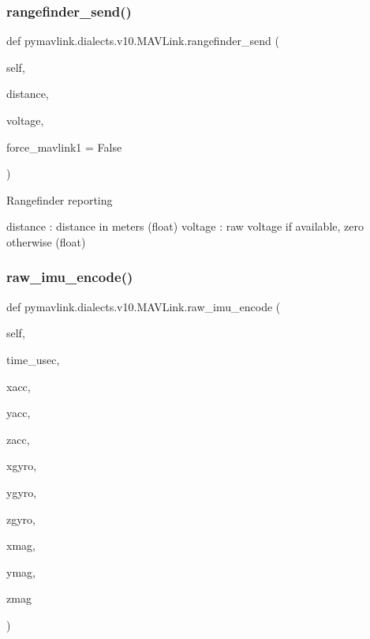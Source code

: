 \begin{DoxyVerb}
\begin{DoxyVerb}
\begin{DoxyVerb}
\begin{DoxyVerb}
\subsubsection{\texorpdfstring{rangefinder\+\_\+send()}{rangefinder\_send()}}
{\footnotesize\ttfamily def pymavlink.\+dialects.\+v10.\+M\+A\+V\+Link.\+rangefinder\+\_\+send (\begin{DoxyParamCaption}\item[{}]{self,  }\item[{}]{distance,  }\item[{}]{voltage,  }\item[{}]{force\+\_\+mavlink1 = {\ttfamily False} }\end{DoxyParamCaption})}

\begin{DoxyVerb}Rangefinder reporting

distance                  : distance in meters (float)
voltage                   : raw voltage if available, zero otherwise (float)\end{DoxyVerb}
 \mbox{\label{classpymavlink_1_1dialects_1_1v10_1_1MAVLink_a106a3af40129278c05f6205932a32ddc}} 
\subsubsection{\texorpdfstring{raw\+\_\+imu\+\_\+encode()}{raw\_imu\_encode()}}
{\footnotesize\ttfamily def pymavlink.\+dialects.\+v10.\+M\+A\+V\+Link.\+raw\+\_\+imu\+\_\+encode (\begin{DoxyParamCaption}\item[{}]{self,  }\item[{}]{time\+\_\+usec,  }\item[{}]{xacc,  }\item[{}]{yacc,  }\item[{}]{zacc,  }\item[{}]{xgyro,  }\item[{}]{ygyro,  }\item[{}]{zgyro,  }\item[{}]{xmag,  }\item[{}]{ymag,  }\item[{}]{zmag }\end{DoxyParamCaption})}


\end{DoxyVerb}
\end{DoxyVerb}
\end{DoxyVerb}
\end{DoxyVerb}
